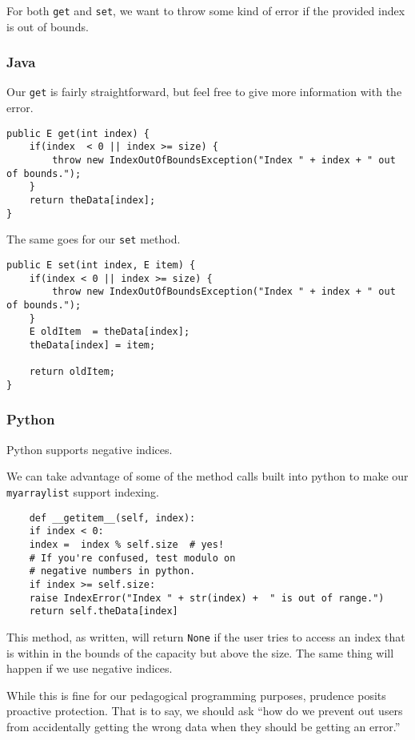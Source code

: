 For both \texttt{get} and \texttt{set}, we want to throw some kind of error if the provided index is out of bounds.
\subsubsection{Java}
Our \texttt{get} is fairly straightforward, but feel free to give more information with the error.
\begin{verbatim}
public E get(int index) {
	if(index  < 0 || index >= size) {
		throw new IndexOutOfBoundsException("Index " + index + " out of bounds.");
	}
	return theData[index];
}
\end{verbatim}

The same goes for our \texttt{set} method. 
\begin{verbatim}
public E set(int index, E item) {
	if(index < 0 || index >= size) {
		throw new IndexOutOfBoundsException("Index " + index + " out of bounds.");
	}
	E oldItem  = theData[index];
	theData[index] = item;
	
	return oldItem;
}
\end{verbatim}

\subsubsection{Python}

Python supports negative indices.  

We can take advantage of some of the method calls built into python to make our \texttt{myarraylist} support indexing.

\begin{verbatim}
	def __getitem__(self, index):
	if index < 0: 
	index =  index % self.size  # yes! 
	# If you're confused, test modulo on 
	# negative numbers in python.
	if index >= self.size:
	raise IndexError("Index " + str(index) +  " is out of range.")       
	return self.theData[index]
\end{verbatim}



This method, as written, will return \texttt{None} if the user tries to access an index that is within in the bounds of the capacity but above the size.
The same thing will happen if we use negative indices.

While this is fine for our pedagogical programming purposes, prudence posits proactive protection.  That is to say, we should ask ``how do we prevent out users from accidentally getting the wrong data when they should be getting an error.''

